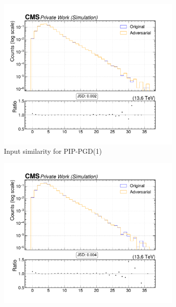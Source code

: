 \begin{figure}[htbp]
  \centering
  \begin{subfigure}[t]{0.32\textwidth}
    \includegraphics[width=\linewidth]{media/output/features/compare/combined_it_1/cmp_global_features_TagVarCSV_jetNSelectedTracks.pdf}
    \caption*{Input similarity for PIP-PGD(1)}
  \end{subfigure}\hfill
  \begin{subfigure}[t]{0.32\textwidth}
    \includegraphics[width=\linewidth]{media/output/features/compare/combined_it_2/cmp_global_features_TagVarCSV_jetNSelectedTracks.pdf}

\end{subfigure}
\end{figure}
